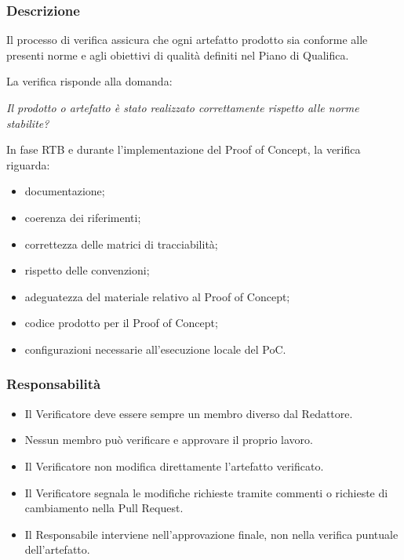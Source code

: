 \subsubsection{Descrizione}

Il processo di verifica assicura che ogni artefatto prodotto sia conforme alle
presenti norme e agli obiettivi di qualità definiti nel Piano di Qualifica.

La verifica risponde alla domanda:

\begin{center}
    \textit{Il prodotto o artefatto è stato realizzato correttamente rispetto alle norme stabilite?}
\end{center}

In fase RTB e durante l'implementazione del Proof of Concept, la verifica riguarda:

\begin{itemize}
    \item documentazione;
    \item coerenza dei riferimenti;
    \item correttezza delle matrici di tracciabilità;
    \item rispetto delle convenzioni;
    \item adeguatezza del materiale relativo al Proof of Concept;
    \item codice prodotto per il Proof of Concept;
    \item configurazioni necessarie all'esecuzione locale del PoC.
\end{itemize}


\subsubsection{Responsabilità}

\begin{itemize}
    \item Il Verificatore deve essere sempre un membro diverso dal Redattore.
    \item Nessun membro può verificare e approvare il proprio lavoro.
    \item Il Verificatore non modifica direttamente l'artefatto verificato.
    \item Il Verificatore segnala le modifiche richieste tramite commenti o richieste
    di cambiamento nella Pull Request.
    \item Il Responsabile interviene nell'approvazione finale, non nella verifica
    puntuale dell'artefatto.
\end{itemize}


